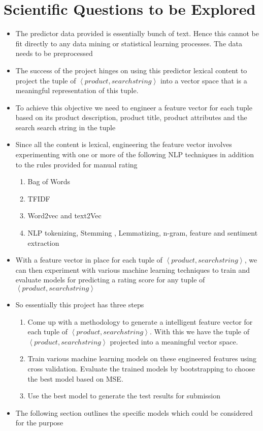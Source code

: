 \documentclass[twoside,12pt]{article}
\newcommand{\tuple}[1]{\ensuremath{\left \langle #1 \right \rangle }}
\begin{document}
\section{Scientific Questions to be Explored}
\label{exploratory}
\begin{itemize}
\item
The predictor data provided is essentially  bunch of text. Hence this cannot be fit directly to any data mining or statistical learning processes. The data needs to be preprocessed
\item
The success of the project hinges on using this predictor lexical content to project the tuple of \tuple{product,searchstring} into a vector space that is a meaningful representation of this tuple.
\item
To achieve this objective we need to engineer a feature vector for each tuple based on its product description, product title, product attributes and the search search string in the tuple
\item
Since all the content is lexical, engineering the feature vector involves experimenting with one or more of the following NLP techniques in addition to the rules provided for manual rating
\begin{enumerate}
\item
Bag of Words
\item
TFIDF
\item
Word2vec and text2Vec
\item
NLP tokenizing, Stemming , Lemmatizing, n-gram, feature and sentiment extraction
\end{enumerate}
\item
With a feature vector in place for each tuple of \tuple{product,searchstring}, we can then experiment with various machine learning techniques to train and evaluate models for predicting a rating score for any tuple of \tuple{product,searchstring}
\item
So essentially this project has three steps
\begin{enumerate}
\item
Come up with a methodology to generate a intelligent feature vector for each tuple of \tuple{product,searchstring}. With this we have the tuple of \tuple{product,searchstring} projected into a  meaningful vector space.
\item
Train various machine learning models on these engineered features using cross validation. Evaluate the trained models by bootstrapping to choose the best model based on MSE.
\item
Use the best model to generate the test results for submission
\end{enumerate}
\item
The following section outlines the specific models which could be considered for the purpose
\end{itemize}
\end{document}

